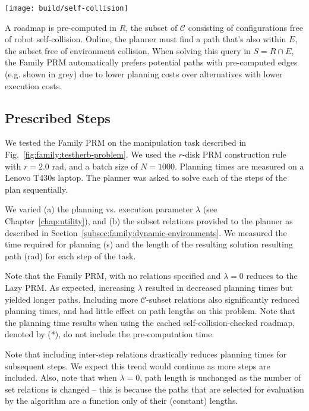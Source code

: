 \begin{marginfigure}
   \centering
   \texttt{[image: build/self-collision]}
   \caption{A roadmap is pre-computed in $R$,
      the subset of $\mathcal{C}$ consisting of configurations free
      of robot self-collision.
      Online, the planner must find a path that's also within $E$,
      the subset free of environment collision.
      When solving this query in $S = R \cap E$,
      the Family PRM automatically prefers potential paths with
      pre-computed edges (e.g. shown in grey)
      due to lower planning costs over alternatives with lower
      execution costs.}
   \label{fig:family:self-collision-example}
\end{marginfigure}

\subsection{Prescribed Steps}

We tested the Family PRM on the manipulation task
described in Fig.~\ref{fig:family:testherb-problem}.
We used the $r$-disk PRM construction rule with $r=2.0$ rad,
and a batch size of $N=1000$.
Planning times are measured on a Lenovo T430s laptop.
The planner was asked to solve each of the steps of the plan
sequentially.

We varied
(a) the planning vs. execution parameter $\lambda$
(see Chapter~\ref{chap:utility}), and
(b) the subset relations provided to the planner
as described in Section~\ref{subsec:family:dynamic-environments}.
We measured the time required for planning (s)
and the length of the resulting solution resulting path (rad)
for each step of the task.

Note that the Family PRM,
with no relations specified and $\lambda=0$
reduces to the Lazy PRM.
As expected,
increasing $\lambda$ resulted in decreased planning times
but yielded longer paths.
Including more $\mathcal{C}$-subset relations
also significantly reduced planning times,
and had little effect on path lengths on this problem.
Note that the planning time results when using
the cached self-collision-checked roadmap, denoted by (*),
do not include the pre-computation time.

Note that including inter-step relations drastically
reduces planning times for subsequent steps.
We expect this trend would continue as more steps are included.
Also, note that when $\lambda=0$,
path length is unchanged as the number of set relations is
changed
-- this is because the paths that are selected for evaluation
by the algorithm are a function only of their (constant) lengths.


